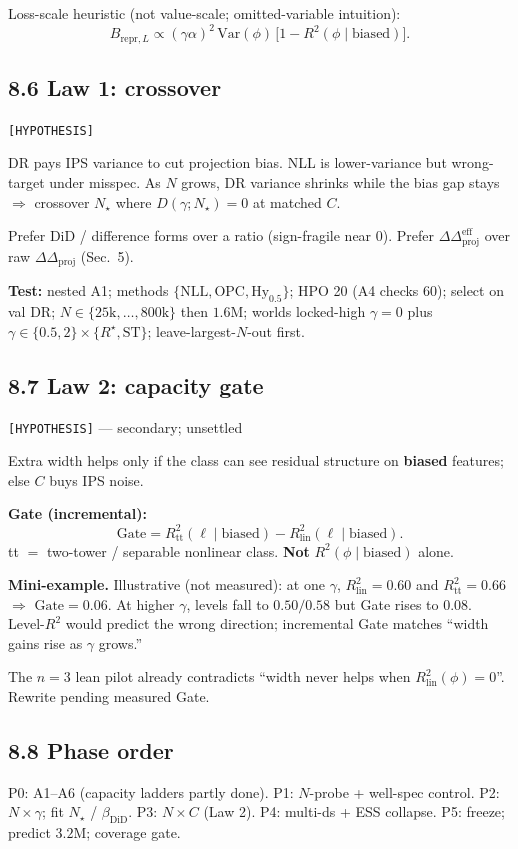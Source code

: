 \documentclass[11pt]{article}
\newcommand{\phonesub}[1]{\Needspace{6\baselineskip}\subsection*{#1}}
\newcommand{\stag}[1]{\texttt{[#1]}}
\newcommand{\Rstar}{R^{\star}}
\newcommand{\DDproj}{\Delta\Delta_{\mathrm{proj}}}
\newcommand{\DDprojeff}{\Delta\Delta_{\mathrm{proj}}^{\mathrm{eff}}}
\newcommand{\miniex}[1]{\par{\footnotesize\color{black!70}\textbf{Mini-example.} #1\par}}
\begin{document}
Loss-scale heuristic (not value-scale;
omitted-variable intuition):
\begin{equation*}
B_{\mathrm{repr},L}
  \propto (\gamma\alpha)^{2}\,\mathrm{Var}(\phi)\,
  \big[1-R^{2}(\phi\mid\mathrm{biased})\big].
\end{equation*}

\phonesub{8.6 Law 1: crossover}
\stag{HYPOTHESIS}

DR pays IPS variance to cut projection bias.
NLL is lower-variance but wrong-target under
misspec.  As $N$ grows, DR variance shrinks
while the bias gap stays $\Rightarrow$
crossover $N_{\star}$ where
$D(\gamma;N_{\star})=0$ at matched $C$.

Prefer DiD / difference forms over a ratio
(sign-fragile near 0).  Prefer
$\DDprojeff$ over raw $\DDproj$ (Sec.~5).

\textbf{Test:} nested A1; methods
$\{\mathrm{NLL},\mathrm{OPC},\mathrm{Hy}_{0.5}\}$;
HPO 20 (A4 checks 60); select on val DR;
$N\in\{25\mathrm{k},\ldots,800\mathrm{k}\}$ then
$1.6$M; worlds locked-high $\gamma{=}0$ plus
$\gamma\in\{0.5,2\}\times\{\Rstar,\mathrm{ST}\}$;
leave-largest-$N$-out first.

\phonesub{8.7 Law 2: capacity gate}
\stag{HYPOTHESIS} --- secondary; unsettled

Extra width helps only if the class can see
residual structure on \textbf{biased}
features; else $C$ buys IPS noise.

\textbf{Gate (incremental):}
\begin{equation*}
\mathrm{Gate}
  = R^{2}_{\mathrm{tt}}(\ell\mid\mathrm{biased})
  - R^{2}_{\mathrm{lin}}(\ell\mid\mathrm{biased}).
\end{equation*}
tt $=$ two-tower / separable nonlinear class.
\textbf{Not} $R^{2}(\phi\mid\mathrm{biased})$
alone.

\miniex{Illustrative (not measured): at one
$\gamma$, $R^{2}_{\mathrm{lin}}{=}0.60$ and
$R^{2}_{\mathrm{tt}}{=}0.66$ $\Rightarrow$
$\mathrm{Gate}{=}0.06$.  At higher $\gamma$,
levels fall to $0.50/0.58$ but Gate rises to
$0.08$.  Level-$R^{2}$ would predict the
wrong direction; incremental Gate matches
``width gains rise as $\gamma$ grows.''}

The $n{=}3$ lean pilot already contradicts
``width never helps when
$R^{2}_{\mathrm{lin}}(\phi){=}0$''.  Rewrite
pending measured Gate.

\phonesub{8.8 Phase order}
P0: A1--A6 (capacity ladders partly done).
P1: $N$-probe + well-spec control.
P2: $N\times\gamma$; fit $N_{\star}$ /
$\beta_{\mathrm{DiD}}$.
P3: $N\times C$ (Law 2).
P4: multi-ds + ESS collapse.
P5: freeze; predict $3.2$M; coverage gate.
\end{document}
